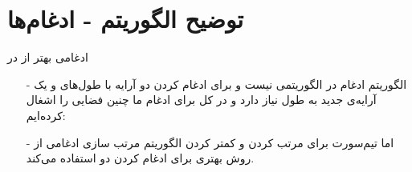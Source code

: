 \section{توضیح الگوریتم - ادغام‌ها}
\begin{frame}{ادغامی بهتر از  در }
\begin{itemize}\itemr
\item[-]
الگوریتم ادغام در  الگوریتمی  نیست و برای ادغام کردن دو آرایه با طول‌های
و
یک آرایه‌ی جدید به طول
نیاز دارد و در کل برای ادغام ما چنین فضایی را اشغال کرده‌ایم:
\begin{flushleft}
\end{flushleft}

\item[-]
اما تیم‌سورت برای  مرتب کردن و کمتر کردن 
الگوریتم مرتب سازی ادغامی از روش بهتری برای ادغام کردن دو  استفاده می‌کند.
\end{itemize}
\end{frame}
